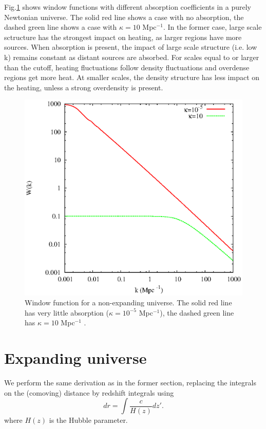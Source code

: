 \documentclass[twocolumns]{emulateapj}
\begin{document}
Fig.\ref{fig:window_newt} shows  window functions with different absorption coefficients in a purely Newtonian universe. The solid red line shows a case with no absorption, the dashed green line shows a case with $\kappa=10$ Mpc$^{-1}$.  In the former case, large scale sctructure has the strongest impact on heating, as larger regions have more sources. When absorption is present,  the impact of large scale structure (i.e. low k) remains constant as distant sources are absorbed. For scales equal to or larger than the cutoff, heating fluctuations follow density fluctuations and overdense regions get more heat. At smaller scales, the density structure has less impact on the heating, unless a strong overdensity is present.  

\begin{figure}
  \centering
  \includegraphics[width = .45\textwidth ]{newtonian_window}
  \caption{Window function for a non-expanding universe. The solid red line has very little absorption ($\kappa=10^{-5}$ Mpc$^{-1}$), the dashed green line has $\kappa=10 $ Mpc$^{-1}$ .}
  \label{fig:window_newt}
\end{figure}



\section{Expanding universe}\label{sec:window_exp}

We perform the same derivation as in the former section, replacing the integrals on the (comoving) distance by redshift integrals using
\begin{equation}
  \label{eq:proper_dist}
  dr=\int \frac{c}{H(z)} dz'.
\end{equation}
where  $H(z)$ is the Hubble parameter.

\end{document}
